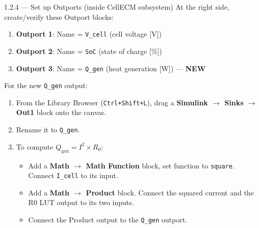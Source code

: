 \documentclass[11pt,a4paper]{article}
\begin{document}
\begin{guistep}{1.2.4 — Set up Outports (inside CellECM subsystem)}
At the right side, create/verify these Outport blocks:
\begin{enumerate}
    \item \textbf{Outport 1}: Name = \texttt{V\_cell} \quad (cell voltage [V])
    \item \textbf{Outport 2}: Name = \texttt{SoC} \quad (state of charge [\%])
    \item \textbf{Outport 3}: Name = \texttt{Q\_gen} \quad (heat generation [W]) — \textbf{NEW}
\end{enumerate}
For the new \texttt{Q\_gen} output:
\begin{enumerate}
    \item From the Library Browser (\texttt{Ctrl+Shift+L}), drag a \textbf{Simulink $\to$ Sinks $\to$ Out1} block onto the canvas.
    \item Rename it to \texttt{Q\_gen}.
    \item To compute $Q_\text{gen} = I^2 \times R_0$:
    \begin{itemize}
        \item Add a \textbf{Math $\to$ Math Function} block, set function to \texttt{square}. Connect \texttt{I\_cell} to its input.
        \item Add a \textbf{Math $\to$ Product} block. Connect the squared current and the R0 LUT output to its two inputs.
        \item Connect the Product output to the \texttt{Q\_gen} outport.
    \end{itemize}
\end{enumerate}
\end{guistep}
\end{document}
